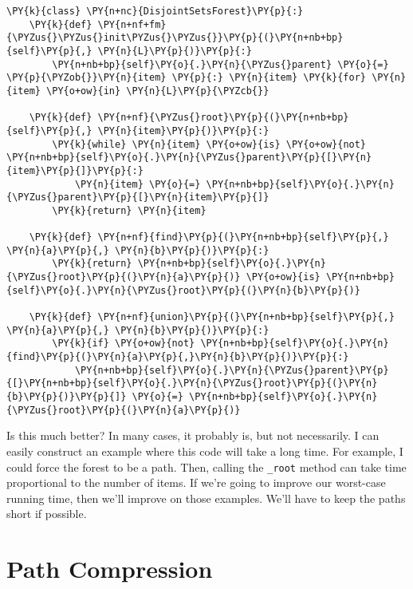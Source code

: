 \begin{Verbatim}[commandchars=\\\{\}]
\PY{k}{class} \PY{n+nc}{DisjointSetsForest}\PY{p}{:}
    \PY{k}{def} \PY{n+nf+fm}{\PYZus{}\PYZus{}init\PYZus{}\PYZus{}}\PY{p}{(}\PY{n+nb+bp}{self}\PY{p}{,} \PY{n}{L}\PY{p}{)}\PY{p}{:}
        \PY{n+nb+bp}{self}\PY{o}{.}\PY{n}{\PYZus{}parent} \PY{o}{=} \PY{p}{\PYZob{}}\PY{n}{item} \PY{p}{:} \PY{n}{item} \PY{k}{for} \PY{n}{item} \PY{o+ow}{in} \PY{n}{L}\PY{p}{\PYZcb{}}

    \PY{k}{def} \PY{n+nf}{\PYZus{}root}\PY{p}{(}\PY{n+nb+bp}{self}\PY{p}{,} \PY{n}{item}\PY{p}{)}\PY{p}{:}
        \PY{k}{while} \PY{n}{item} \PY{o+ow}{is} \PY{o+ow}{not} \PY{n+nb+bp}{self}\PY{o}{.}\PY{n}{\PYZus{}parent}\PY{p}{[}\PY{n}{item}\PY{p}{]}\PY{p}{:}
            \PY{n}{item} \PY{o}{=} \PY{n+nb+bp}{self}\PY{o}{.}\PY{n}{\PYZus{}parent}\PY{p}{[}\PY{n}{item}\PY{p}{]}
        \PY{k}{return} \PY{n}{item}

    \PY{k}{def} \PY{n+nf}{find}\PY{p}{(}\PY{n+nb+bp}{self}\PY{p}{,} \PY{n}{a}\PY{p}{,} \PY{n}{b}\PY{p}{)}\PY{p}{:}
        \PY{k}{return} \PY{n+nb+bp}{self}\PY{o}{.}\PY{n}{\PYZus{}root}\PY{p}{(}\PY{n}{a}\PY{p}{)} \PY{o+ow}{is} \PY{n+nb+bp}{self}\PY{o}{.}\PY{n}{\PYZus{}root}\PY{p}{(}\PY{n}{b}\PY{p}{)}

    \PY{k}{def} \PY{n+nf}{union}\PY{p}{(}\PY{n+nb+bp}{self}\PY{p}{,} \PY{n}{a}\PY{p}{,} \PY{n}{b}\PY{p}{)}\PY{p}{:}
        \PY{k}{if} \PY{o+ow}{not} \PY{n+nb+bp}{self}\PY{o}{.}\PY{n}{find}\PY{p}{(}\PY{n}{a}\PY{p}{,}\PY{n}{b}\PY{p}{)}\PY{p}{:}
            \PY{n+nb+bp}{self}\PY{o}{.}\PY{n}{\PYZus{}parent}\PY{p}{[}\PY{n+nb+bp}{self}\PY{o}{.}\PY{n}{\PYZus{}root}\PY{p}{(}\PY{n}{b}\PY{p}{)}\PY{p}{]} \PY{o}{=} \PY{n+nb+bp}{self}\PY{o}{.}\PY{n}{\PYZus{}root}\PY{p}{(}\PY{n}{a}\PY{p}{)}
\end{Verbatim}



Is this much better? In many cases, it probably is, but not necessarily. I can easily construct an example where this code will take a long time. For example, I could force the forest to be a path. Then, calling the \texttt{\_root} method can take time proportional to the number of items. If we're going to improve our worst-case running time, then we'll improve on those examples. We'll have to keep the paths short if possible.

\chapter{Path Compression}


